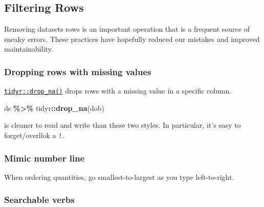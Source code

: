 \documentclass[
]{book}
\newenvironment{Shaded}{\begin{snugshade}}{\end{snugshade}}
\newcommand{\KeywordTok}[1]{\textcolor[rgb]{0.13,0.29,0.53}{\textbf{#1}}}
\newcommand{\NormalTok}[1]{#1}
\newcommand{\OperatorTok}[1]{\textcolor[rgb]{0.81,0.36,0.00}{\textbf{#1}}}
\newcommand{\StringTok}[1]{\textcolor[rgb]{0.31,0.60,0.02}{#1}}
\begin{document}
\hypertarget{style-filter}{%
\subsection{Filtering Rows}\label{style-filter}}

Removing datasets rows is an important operation that is a frequent source of sneaky errors. These practices have hopefully reduced our mistakes and improved maintainability.

\hypertarget{style-filter-drop_na}{%
\subsubsection{Dropping rows with missing values}\label{style-filter-drop_na}}

\href{}{\texttt{tidyr::drop\_na()}} drops rows with a missing value in a specific column.

\begin{Shaded}
\begin{Highlighting}[]
\NormalTok{ds }\OperatorTok{\%>\%}
\StringTok{  }\NormalTok{tidyr}\OperatorTok{::}\KeywordTok{drop\_na}\NormalTok{(dob)}
\end{Highlighting}
\end{Shaded}

is cleaner to read and write than these two styles. In particular, it's easy to forget/overllok a \texttt{!}.

\begin{Shaded}
\end{Shaded}

\hypertarget{style-filter-number-line}{%
\subsubsection{Mimic number line}\label{style-filter-number-line}}

When ordering quantities, go smallest-to-largest as you type left-to-right.

\hypertarget{style-filter-searchable}{%
\subsubsection{Searchable verbs}\label{style-filter-searchable}}
\end{document}
